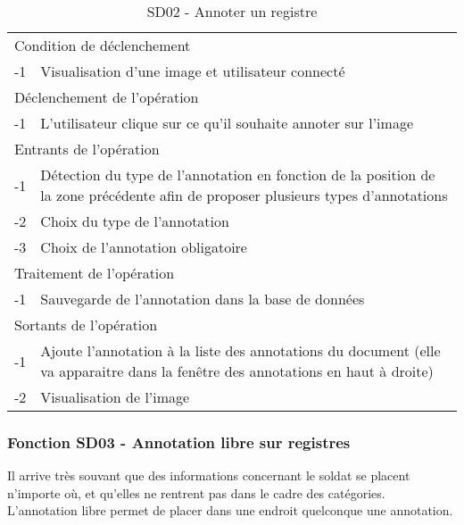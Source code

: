 \documentclass[a4paper]{article}
\begin{document}
\begin{table}[H]
  \centering
   \small
	\begin{tabular}{|c|p{12cm}|}
   		\hline
   			\rowcolor{lightgray}\multicolumn{2}{|c|}{\textbf{SD02 - Annoter un registre}} \\
   		\hline
   			\multicolumn{2}{|l|}{Condition de d\'eclenchement} \\
   		\hline
   			-1 & Visualisation d’une image et utilisateur connecté\\
   		\hline
   			\multicolumn{2}{|l|}{D\'eclenchement de l'op\'eration} \\
   		\hline
   			-1 & L’utilisateur clique sur ce qu’il souhaite annoter sur l’image\\
   		\hline
   			\multicolumn{2}{|l|}{Entrants de l'op\'eration} \\
   		\hline
   			-1 & Détection du type de l’annotation en fonction de la position de la zone précédente afin de proposer plusieurs types d’annotations\\
            -2 & Choix du type de l’annotation \\
			-3 & Choix de l’annotation obligatoire \\
   		\hline
   			\multicolumn{2}{|l|}{Traitement de l'op\'eration} \\
  		\hline
   			-1 & Sauvegarde de l’annotation dans la base de données\\
   		\hline
   			\multicolumn{2}{|l|}{Sortants de l'op\'eration} \\
   		\hline
   			-1 & Ajoute l’annotation à la liste des annotations du document (elle va apparaitre dans la fenêtre des annotations en haut à droite)\\
			-2 & Visualisation de l’image\\
   		\hline
	\end{tabular}
  \caption{SD02 - Annoter un registre}
  \normalsize
  \label{tab:annoter_registre}
\end{table}

\subsubsection{Fonction SD03 - Annotation libre sur registres}
Il arrive tr\`es souvant que des informations concernant le soldat se placent n'importe o\`u, et qu'elles ne rentrent pas dans le cadre des cat\'egories. L'annotation libre permet de placer dans une endroit quelconque une annotation. \\
\end{document}
